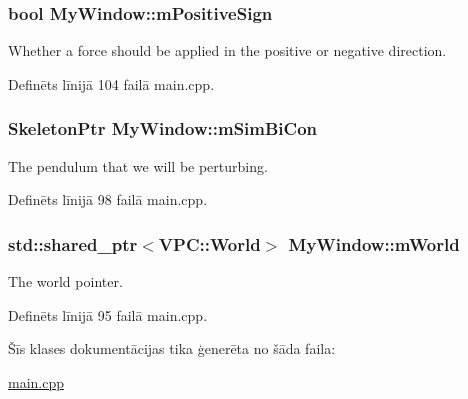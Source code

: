 \subsubsection[{\texorpdfstring{m\+Positive\+Sign}{mPositiveSign}}]{\setlength{\rightskip}{0pt plus 5cm}bool My\+Window\+::m\+Positive\+Sign\hspace{0.3cm}{\ttfamily [protected]}}\hypertarget{class_my_window_a8b21e90e07f6cd150eedb8b596be4800}{}\label{class_my_window_a8b21e90e07f6cd150eedb8b596be4800}


Whether a force should be applied in the positive or negative direction. 



Definēts līnijā 104 failā main.\+cpp.

\subsubsection[{\texorpdfstring{m\+Sim\+Bi\+Con}{mSimBiCon}}]{\setlength{\rightskip}{0pt plus 5cm}Skeleton\+Ptr My\+Window\+::m\+Sim\+Bi\+Con\hspace{0.3cm}{\ttfamily [protected]}}\hypertarget{class_my_window_a61f5d7b9cf55734d36a616902420cc1e}{}\label{class_my_window_a61f5d7b9cf55734d36a616902420cc1e}


The pendulum that we will be perturbing. 



Definēts līnijā 98 failā main.\+cpp.

\subsubsection[{\texorpdfstring{m\+World}{mWorld}}]{\setlength{\rightskip}{0pt plus 5cm}std\+::shared\+\_\+ptr$<${\bf V\+P\+C\+::\+World}$>$ My\+Window\+::m\+World\hspace{0.3cm}{\ttfamily [protected]}}\hypertarget{class_my_window_a395fd6ff98a01ac7850471b7d584bf66}{}\label{class_my_window_a395fd6ff98a01ac7850471b7d584bf66}


The world pointer. 



Definēts līnijā 95 failā main.\+cpp.



Šīs klases dokumentācijas tika ģenerēta no šāda faila\+:\begin{DoxyCompactItemize}
\item 
\hyperlink{main_8cpp}{main.\+cpp}\end{DoxyCompactItemize}
